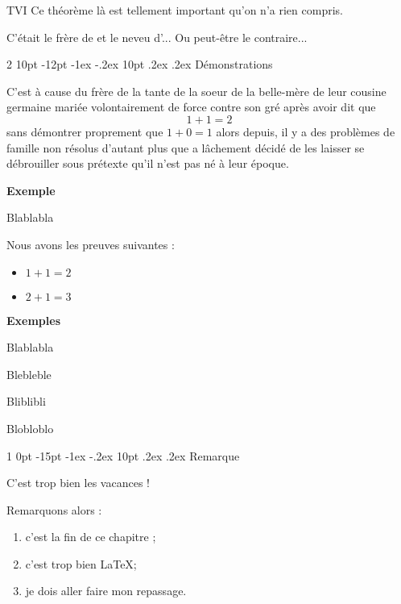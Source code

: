 \documentclass[10pt,openright,oneside,french]{book}
\makeatletter
\renewcommand{\section}{%
    \@startsection{section}%
    {1}%
    {0pt}%
    {-15pt \@plus -1ex \@minus -.2ex}%
    {10pt \@plus .2ex \@minus .2ex}%
    {\normalfont\Large\bfseries\color{red}}%
}
\renewcommand{\subsection}{%
    \@startsection{subsection}%
    {2}%
    {10pt}%
    {-12pt \@plus -1ex \@minus -.2ex}%
    {10pt \@plus .2ex \@minus.2ex}%
    {\normalfont\large\bfseries\color{OliveGreen}}%
}
\newenvironment{Exemple}[1][]
{\sffamily\small\color{gray!125}%
\begin{minipage}[t]{0.1\textwidth}
    \textbf{Exemple#1} \textbullet
\end{minipage}\quad
\begin{minipage}[t]{0.85\textwidth}
}
{\end{minipage}\normalsize\par\bigskip}
\makeatother
\begin{document}
\begin{Thm}{TVI}
    Ce théorème là est tellement important qu'on n'a rien compris.
\end{Thm}

\begin{Thm}[s]{}
    C'était le frère de  et le neveu d'... Ou peut-être le contraire...
\end{Thm}

\subsection{Démonstrations}
\begin{Demo}
    C'est à cause du frère de la tante de la s{oe}ur de la belle-mère de leur cousine germaine mariée volontairement de force contre son gré après avoir dit que \[1 + 1 = 2\] sans démontrer proprement que $1 + 0 = 1$ alors depuis, il y a des problèmes de famille non résolus d'autant plus que  a lâchement décidé de les laisser se débrouiller sous prétexte qu'il n'est pas né à leur époque.
\end{Demo}

\begin{Exemple}
    Blablabla
\end{Exemple}

\begin{Demo}[s]
Nous avons les preuves suivantes :
\begin{itemize}
\item $1+1 = 2$
\item $2+1 = 3$
\end{itemize}
\end{Demo}

\begin{Exemple}[s]
    Blablabla\par
    Blebleble\par
    Bliblibli\par
    Blobloblo
\end{Exemple}

\section{Remarque}

\begin{Rmq}
    C'est trop bien les vacances !
\end{Rmq}

\begin{Rmq}[s]
Remarquons alors :

    \begin{enumerate}
        \item c'est la fin de ce chapitre ;
        \item c'est trop bien \LaTeX ;
        \item je dois aller faire mon repassage.
    \end{enumerate}
\end{Rmq}\clearpage
\end{document}
